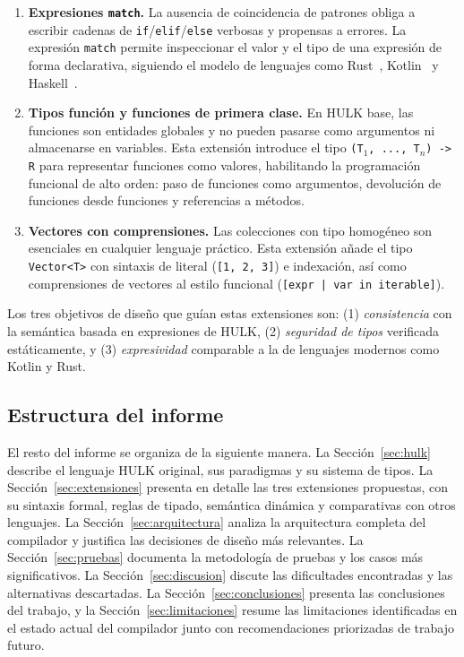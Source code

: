 \documentclass[12pt, a4paper]{article}
\begin{document}
\begin{enumerate}[leftmargin=*, label=\arabic*.]
    \item \textbf{Expresiones \texttt{match}.}
    La ausencia de coincidencia de patrones obliga a escribir cadenas de
    \texttt{if}/\texttt{elif}/\texttt{else} verbosas y propensas a errores.
    La expresión \texttt{match} permite inspeccionar el valor y el tipo de una
    expresión de forma declarativa, siguiendo el modelo de lenguajes como Rust~\cite{klabnik2019},
    Kotlin~\cite{jemerov2017} y Haskell~\cite{marlow2010}.

    \item \textbf{Tipos función y funciones de primera clase.}
    En HULK base, las funciones son entidades globales y no pueden pasarse como
    argumentos ni almacenarse en variables. Esta extensión introduce el tipo
    \texttt{(T$_1$, ..., T$_n$) -> R} para representar funciones como valores,
    habilitando la programación funcional de alto orden: paso de funciones como
    argumentos, devolución de funciones desde funciones y referencias a métodos.

    \item \textbf{Vectores con comprensiones.}
    Las colecciones con tipo homogéneo son esenciales en cualquier lenguaje
    práctico. Esta extensión añade el tipo \texttt{Vector<T>} con sintaxis de
    literal (\texttt{[1, 2, 3]}) e indexación, así como comprensiones de vectores
    al estilo funcional (\texttt{[expr | var in iterable]}).
\end{enumerate}

Los tres objetivos de diseño que guían estas extensiones son: (1)
\textit{consistencia} con la semántica basada en expresiones de HULK,
(2) \textit{seguridad de tipos} verificada estáticamente, y (3)
\textit{expresividad} comparable a la de lenguajes modernos como Kotlin y Rust.

\subsection{Estructura del informe}

El resto del informe se organiza de la siguiente manera. La
Sección~\ref{sec:hulk} describe el lenguaje HULK original, sus paradigmas y su
sistema de tipos. La Sección~\ref{sec:extensiones} presenta en detalle las tres
extensiones propuestas, con su sintaxis formal, reglas de tipado, semántica
dinámica y comparativas con otros lenguajes. La Sección~\ref{sec:arquitectura}
analiza la arquitectura completa del compilador y justifica las decisiones de
diseño más relevantes. La Sección~\ref{sec:pruebas}
documenta la metodología de pruebas y los casos más significativos. La
Sección~\ref{sec:discusion} discute las dificultades encontradas y las
alternativas descartadas. La Sección~\ref{sec:conclusiones} presenta las
conclusiones del trabajo, y la Sección~\ref{sec:limitaciones} resume las
limitaciones identificadas en el estado actual del compilador junto con
recomendaciones priorizadas de trabajo futuro.
\end{document}
